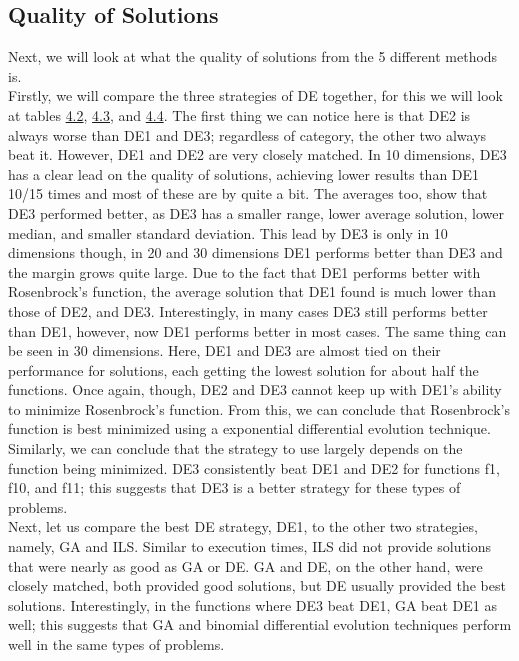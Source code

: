 \documentclass[paper=a4, fontsize=11pt]{scrartcl} %
\numberwithin{equation}{section} %
\numberwithin{figure}{section} %
\numberwithin{table}{section} %
\begin{document}
	\subsection{Quality of Solutions}
		Next, we will look at what the quality of solutions from the 5 different methods is.\\ Firstly, we will compare the three strategies of DE together, for this we will look at tables \hyperref[DE_10]{4.2}, \hyperref[DE_20]{4.3}, and \hyperref[DE_30]{4.4}. The first thing we can notice here is that DE2 is always worse than DE1 and DE3; regardless of category, the other two always beat it. However, DE1 and DE2 are very closely matched. In 10 dimensions, DE3 has a clear lead on the quality of solutions, achieving lower results than DE1 10/15 times and most of these are by quite a bit. The averages too, show that DE3 performed better, as DE3 has a smaller range, lower average solution, lower median, and smaller standard deviation. This lead by DE3 is only in 10 dimensions though, in 20 and 30 dimensions DE1 performs better than DE3 and the margin grows quite large. Due to the fact that DE1 performs better with Rosenbrock's function, the average solution that DE1 found is much lower than those of DE2, and DE3. Interestingly, in many cases DE3 still performs better than DE1, however, now DE1 performs better in most cases. The same thing can be seen in 30 dimensions. Here, DE1 and DE3 are almost tied on their performance for solutions, each getting the lowest solution for about half the functions. Once again, though, DE2 and DE3 cannot keep up with DE1's ability to minimize Rosenbrock's function. From this, we can conclude that Rosenbrock's function is best minimized using a exponential differential evolution technique. Similarly, we can conclude that the strategy to use largely depends on the function being minimized. DE3 consistently beat DE1 and DE2 for functions f1, f10, and f11; this suggests that DE3 is a better strategy for these types of problems.\\
		Next, let us compare the best DE strategy, DE1, to the other two strategies, namely, GA and ILS. Similar to execution times, ILS did not provide solutions that were nearly as good as GA or DE. GA and DE, on the other hand, were closely matched, both provided good solutions, but DE usually provided the best solutions. Interestingly, in the functions where DE3 beat DE1, GA beat DE1 as well; this suggests that GA and binomial differential evolution techniques perform well in the same types of problems.
		
\end{document}
